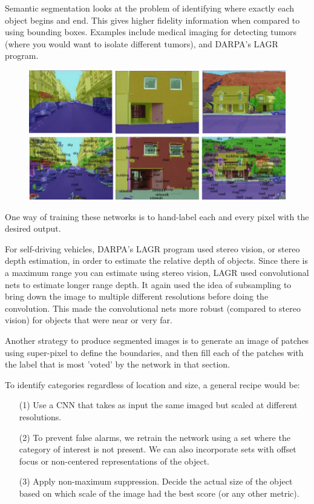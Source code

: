 Semantic segmentation looks at the problem of identifying where exactly each object begins and end.
This gives higher fidelity information when compared to using bounding boxes.
Examples include medical imaging for detecting tumors (where you would want to isolate different tumors), and DARPA's LAGR program.

\begin{figure}[!ht]
\centering
	\includegraphics[width=0.8\linewidth]{lectures/04-a/images/semantic-segmentation.png}
\label{fig:SemanticSegmentation}
\end{figure}

One way of training these networks is to hand-label each and every pixel with the desired output.

For self-driving vehicles, DARPA's LAGR program used stereo vision, or stereo depth estimation, in order to estimate the relative depth of objects.
Since there is a maximum range you can estimate using stereo vision, LAGR used convolutional nets to estimate longer range depth.
It again used the idea of subsampling to bring down the image to multiple different resolutions before doing the convolution.
This made the convolutional nets more robust (compared to stereo vision) for objects that were near or very far.


Another strategy to produce segmented images is to generate an image of patches using super-pixel to define the boundaries, and then fill each of the patches with the label that is most 'voted' by the network in that section. 

\noindent
To identify categories regardless of location and size, a general recipe would be:
\begin{itemize}
\item[(1)] Use a CNN that takes as input the same imaged but scaled at different resolutions. 
\item[(2)] To prevent false alarms, we retrain the network using a set where the category of interest is not present. We can also incorporate sets with offset focus or non-centered representations of the object. 
\item[(3)] Apply non-maximum suppression. Decide the actual size of the object based on which scale of the image had the best score (or any other metric). 
\end{itemize}
